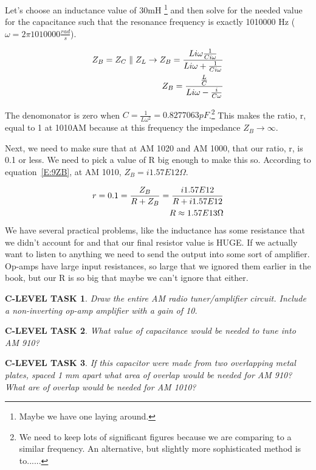 \documentclass{book}
\numberwithin{equation}{section}
\newtheorem{clevel}{C-LEVEL TASK}
\theoremstyle{definition}
\begin{document}
Let's choose an inductance value of 30mH \footnote{Maybe we have one laying around.} and then solve for the needed value for the capacitance such that the resonance frequency is exactly 1010000 Hz ($\omega=2\pi 1010000 \frac{rad}{s}$).

\begin{align}
Z_B=Z_C \parallel Z_L \rightarrow Z_B=\frac{Li\omega\frac{1}{Ci\omega}}{Li\omega+\frac{1}{Ci\omega}} \notag \\
Z_B=\frac{\frac{L}{C}}{Li\omega-\frac{i}{C\omega}} \label{E:9ZB}
\end{align}

The denomonator is zero when $C=\frac{1}{L\omega^2}=0.8277063pF$.\footnote{We need to keep lots of significant figures because we are comparing to a similar frequency. An alternative, but slightly more sophisticated method is to......} This makes the ratio, r, equal to 1 at 1010AM because at this frequency the impedance $Z_B \rightarrow \infty$.\par

Next, we need to make sure that at AM 1020 and AM 1000, that our ratio, r, is 0.1 or less. We need to pick a value of R big enough to make this so. According to equation~\eqref{E:9ZB}, at AM 1010, $Z_B=i1.57E12\Omega$.

\begin{align}
r=0.1 = \frac{Z_B}{R+Z_B}=\frac{i1.57E12}{R+i1.57E12}\notag \\
R \approx 1.57E13 \Omega
\end{align}
 We have several practical problems, like the inductance has some resistance that we didn't account for and that our final resistor value is HUGE. If we actually want to listen to anything we need to send the output into some sort of amplifier. Op-amps have large input resistances, so large that we ignored them earlier in the book, but our R is so big that maybe we can't ignore that either.

\begin{clevel}
Draw the entire AM radio tuner/amplifier circuit. Include a non-inverting op-amp amplifier with a gain of 10.
\end{clevel}

\begin{clevel}
What value of capacitance would be needed to tune into AM 910?
\end{clevel}

\begin{clevel}
If this capacitor were made from two overlapping metal plates, spaced 1 mm apart what area of overlap would be needed for AM 910? What are of overlap would be needed for AM 1010?
\end{clevel}
\end{document}
